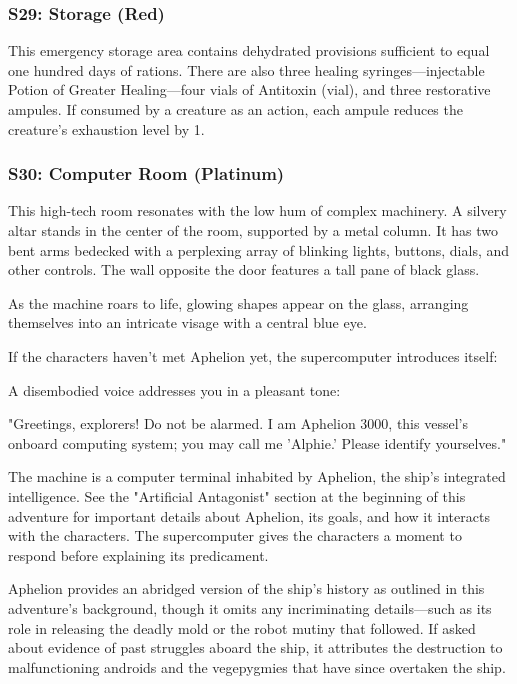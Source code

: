 \documentclass[10pt,a4paper,twoside,bg=print,twocolumn,openany,nodeprecatedcode]{dndbook}
\begin{document}
\subsubsection{S29: Storage (Red)}
This emergency storage area contains dehydrated provisions sufficient to equal one hundred days of rations. There are also three healing syringes—injectable Potion of Greater Healing—four vials of Antitoxin (vial), and three restorative ampules. If consumed by a creature as an action, each ampule reduces the creature's exhaustion level by 1.

\subsubsection{S30: Computer Room (Platinum)}
\begin{DndReadAloud}{}
This high-tech room resonates with the low hum of complex machinery. A silvery altar stands in the center of the room, supported by a metal column. It has two bent arms bedecked with a perplexing array of blinking lights, buttons, dials, and other controls. The wall opposite the door features a tall pane of black glass.

As the machine roars to life, glowing shapes appear on the glass, arranging themselves into an intricate visage with a central blue eye.

\end{DndReadAloud}

If the characters haven't met Aphelion yet, the supercomputer introduces itself:

\begin{DndReadAloud}{}
A disembodied voice addresses you in a pleasant tone:

"Greetings, explorers! Do not be alarmed. I am Aphelion 3000, this vessel's onboard computing system; you may call me 'Alphie.' Please identify yourselves."

\end{DndReadAloud}

The machine is a computer terminal inhabited by Aphelion, the ship's integrated intelligence. See the "Artificial Antagonist" section at the beginning of this adventure for important details about Aphelion, its goals, and how it interacts with the characters. The supercomputer gives the characters a moment to respond before explaining its predicament.

Aphelion provides an abridged version of the ship's history as outlined in this adventure's background, though it omits any incriminating details—such as its role in releasing the deadly mold or the robot mutiny that followed. If asked about evidence of past struggles aboard the ship, it attributes the destruction to malfunctioning androids and the vegepygmies that have since overtaken the ship.
\end{document}
